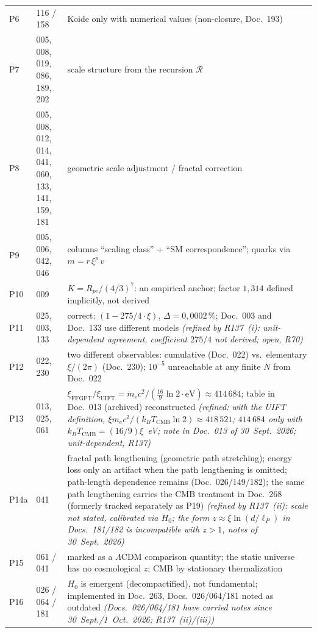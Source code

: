 \begin{longtable}{@{}p{0.9cm}p{3.1cm}p{10.2cm}@{}}
P6 & 116 / 158 & Koide only with numerical values (non-closure, Doc.~193) \\
P7 & 005, 008, 019, 086, 189, 202 & scale structure from the recursion $\mathcal{R}$ \\
P8 & 005, 008, 012, 014, 041, 060, 133, 141, 159, 181 & geometric scale adjustment / fractal correction \\
P9 & 005, 006, 042, 046 & columns \enquote{scaling class} + \enquote{SM correspondence}; \newline quarks via $m = r\,\xi^p\,v$ \\
P10 & 009 & $K = R_{pe}/(4/3)^7$: an empirical anchor; \newline factor $1{,}314$ defined implicitly, not derived \\
P11 & 025, 003, 133 & correct: $(1-275/4\cdot\xi)$, $\Delta=0{,}0002\,\%$; \newline Doc.~003 and Doc.~133 use different models \emph{(refined by R137~(i): unit-dependent agreement, coefficient $275/4$ not derived; open, R70)} \\
P12 & 022, 230 & two different observables: cumulative (Doc.~022) vs.\ elementary $\xi/(2\pi)$ (Doc.~230); $10^{-5}$ unreachable at any finite $N$ from Doc.~022 \\
P13 & 013, 025, 061 & $\xi_\text{FFGFT}/\xi_\text{UIFT} = m_ec^2/(\frac{16}{9}\ln 2\cdot\text{eV}) \approx 414\,684$; \newline table in Doc.~013 (archived) reconstructed \emph{(refined: with the UIFT definition, $\xi m_ec^2/(k_BT_{\mathrm{CMB}}\ln 2)\approx418\,521$; $414\,684$ only with $k_BT_{\mathrm{CMB}}=(16/9)\xi$~eV; note in Doc.~013 of 30~Sept.~2026; unit-dependent, R137)} \\
P14a & 041 & fractal path lengthening (geometric path stretching); energy loss only an artifact when the path lengthening is omitted; path-length dependence remains (Doc.~026/149/182); the same path lengthening carries the CMB treatment in Doc.~268 (formerly tracked separately as P19) \emph{(refined by R137~(ii): scale not stated, calibrated via $H_0$; the form $z\approx\xi\ln(d/\ell_P)$ in Docs.~181/182 is incompatible with $z>1$, notes of 30~Sept.~2026)} \\
P15 & 061 / 041 & marked as a $\Lambda$CDM comparison quantity; the static universe has no cosmological $z$; CMB by stationary thermalization \\
P16 & 026 / 064 / 181 & $H_0$ is emergent (decompactified), not fundamental; implemented in Doc.~263, Docs.~026/064/181 noted as outdated \emph{(Docs.~026/064/181 have carried notes since 30~Sept./1~Oct.~2026; R137~(ii)/(iii))} \\

\end{longtable}
